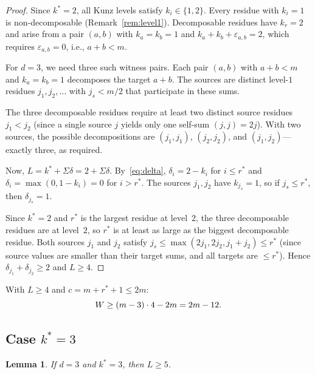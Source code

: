 \documentclass[11pt]{amsart}
\newtheorem{lemma}[theorem]{Lemma}
\theoremstyle{definition}
\theoremstyle{remark}
\begin{document}
\begin{proof}
Since $k^* = 2$, all Kunz levels satisfy $k_i \in \{1, 2\}$.
Every residue with $k_i = 1$ is non-decomposable (Remark~\ref{rem:level1}).
Decomposable residues have $k_r = 2$ and arise from a pair $(a, b)$
with $k_a = k_b = 1$ and $k_a + k_b + \varepsilon_{a,b} = 2$,
which requires $\varepsilon_{a,b} = 0$, i.e., $a + b < m$.

For $d = 3$, we need three such witness pairs.  Each pair $(a, b)$ with
$a + b < m$ and $k_a = k_b = 1$ decomposes the target $a + b$.
The sources are distinct level-$1$ residues $j_1, j_2, \ldots$ with
$j_s < m/2$ that participate in these sums.

The three decomposable residues require at least two distinct source residues
$j_1 < j_2$ (since a single source $j$ yields only one self-sum $(j, j) = 2j$).
With two sources, the possible decompositions are $(j_1, j_1)$, $(j_2, j_2)$,
and $(j_1, j_2)$---exactly three, as required.

Now, $L = k^* + \Sigma\delta = 2 + \Sigma\delta$.  By~\eqref{eq:delta},
$\delta_i = 2 - k_i$ for $i \le r^*$ and $\delta_i = \max(0, 1 - k_i) = 0$
for $i > r^*$.  The sources $j_1, j_2$ have $k_{j_s} = 1$, so if
$j_s \le r^*$, then $\delta_{j_s} = 1$.

Since $k^* = 2$ and $r^*$ is the largest residue at level~$2$,
the three decomposable residues are at level~$2$, so $r^*$ is at least
as large as the biggest decomposable residue.
Both sources $j_1$ and $j_2$ satisfy $j_s \le \max(2j_1, 2j_2, j_1 + j_2) \le r^*$
(since source values are smaller than their target sums, and all targets are $\le r^*$).
Hence $\delta_{j_1} + \delta_{j_2} \ge 2$ and $L \ge 4$.
\end{proof}

With $L \ge 4$ and $c = m + r^* + 1 \le 2m$:
\[
  W \ge (m - 3) \cdot 4 - 2m = 2m - 12. \qedhere
\]

\subsection{Case $k^* = 3$}

\begin{lemma}\label{lem:C-k3-L}
If $d = 3$ and $k^* = 3$, then $L \ge 5$.
\end{lemma}
\end{document}
